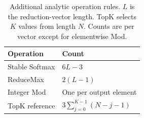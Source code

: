 \begin{table}[t]
\centering
\small
\caption{Additional analytic operation rules. $L$ is the reduction-vector length. TopK selects $K$ values from length $N$. Counts are per vector except for elementwise Mod.}
\label{tab:weighted-operations}
\begin{tabular}{@{}ll@{}}
\toprule
Operation & Count \\
\midrule
Stable Softmax & $6L-3$ \\
ReduceMax & $2(L-1)$ \\
Integer Mod & One per output element \\
TopK reference & $3\sum_{j=0}^{K-1}(N-j-1)$ \\
\bottomrule
\end{tabular}
\end{table}
